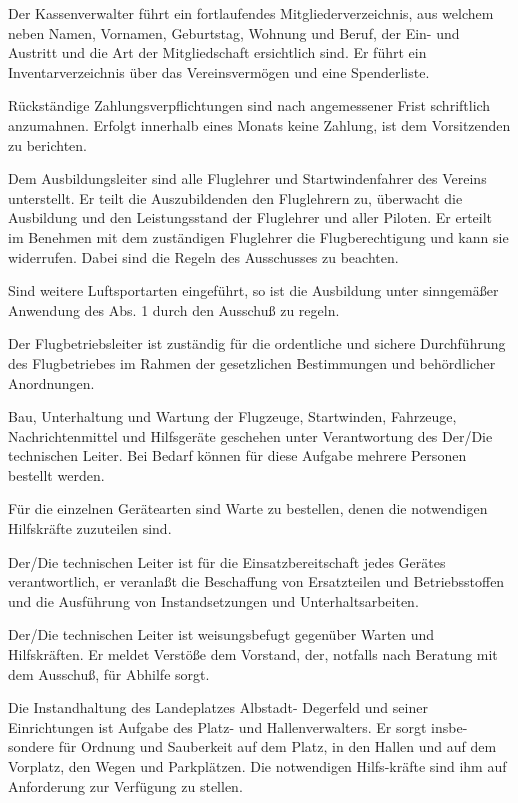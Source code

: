 \documentclass[11pt,a4paper,parskip=half]{scrartcl}
\begin{document}
\begin{contract}
\begin{multicols}{2}
		Der Kassenverwalter führt ein fortlaufendes
		Mitgliederverzeichnis, aus welchem neben Namen,
		Vornamen, Geburtstag, Wohnung und Beruf, der
		Ein- und Austritt und die Art der Mitgliedschaft
		ersichtlich sind. Er führt ein Inventarverzeichnis
		über das Vereinsvermögen und eine Spenderliste.
		
		Rückständige Zahlungsverpflichtungen sind nach
		angemessener Frist schriftlich anzumahnen. Erfolgt
		innerhalb eines Monats keine Zahlung, ist dem
		Vorsitzenden zu berichten.
		
		Dem Ausbildungsleiter sind alle Fluglehrer und
		Startwindenfahrer des Vereins unterstellt. Er teilt
		die Auszubildenden den Fluglehrern zu, überwacht
		die Ausbildung und den Leistungsstand der
		Fluglehrer und aller Piloten. Er erteilt im
		Benehmen mit dem zuständigen Fluglehrer die
		Flugberechtigung und kann sie widerrufen. Dabei
		sind die Regeln des Ausschusses zu beachten.
		
		Sind weitere Luftsportarten eingeführt, so ist die
		Ausbildung unter sinngemäßer Anwendung des
		Abs. 1 durch den Ausschuß zu regeln.
		
		Der Flugbetriebsleiter ist zuständig für die
		ordentliche und sichere Durchführung
		des Flugbetriebes im Rahmen der gesetzlichen
		Bestimmungen und behördlicher Anordnungen.
		
		Bau, Unterhaltung und Wartung der Flugzeuge,
		Startwinden, Fahrzeuge, Nachrichtenmittel und
		Hilfsgeräte geschehen unter Verantwortung des
		Der/Die technischen Leiter. Bei Bedarf können für
		diese Aufgabe mehrere Personen bestellt werden.
		
		Für die einzelnen Gerätearten sind Warte zu
		bestellen, denen die notwendigen Hilfskräfte
		zuzuteilen sind.
		
		Der/Die technischen Leiter ist für die
		Einsatzbereitschaft jedes Gerätes verantwortlich,
		er veranlaßt die Beschaffung von Ersatzteilen und
		Betriebsstoffen und die Ausführung von
		Instandsetzungen und Unterhaltsarbeiten.
		
		Der/Die technischen Leiter ist weisungsbefugt
		gegenüber Warten und Hilfskräften. Er meldet
		Verstöße dem Vorstand, der, notfalls nach
		Beratung mit dem Ausschuß, für Abhilfe sorgt.
		
		Die Instandhaltung des Landeplatzes Albstadt-
		Degerfeld und seiner Einrichtungen ist Aufgabe des
		Platz- und Hallenverwalters. Er sorgt insbe-sondere
		für Ordnung und Sauberkeit auf dem Platz, in den
		Hallen und auf dem Vorplatz, den Wegen und
		Parkplätzen. Die notwendigen Hilfs-kräfte sind ihm
		auf Anforderung zur Verfügung zu stellen.
		

\end{multicols}
\end{contract}
\end{document}
